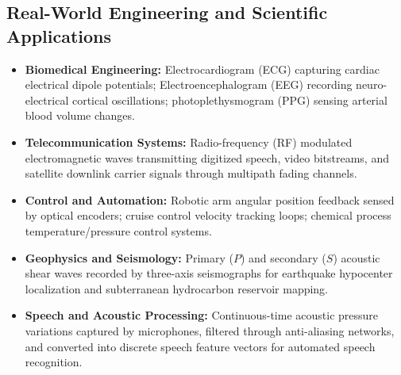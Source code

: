 \documentclass[12pt,a4paper]{article}
\begin{document}
\subsection{Real-World Engineering and Scientific Applications}
\begin{itemize}[leftmargin=*, itemsep=3pt]
  \item \textbf{Biomedical Engineering:} Electrocardiogram (ECG) capturing cardiac electrical dipole potentials; Electroencephalogram (EEG) recording neuro-electrical cortical oscillations; photoplethysmogram (PPG) sensing arterial blood volume changes.
  \item \textbf{Telecommunication Systems:} Radio-frequency (RF) modulated electromagnetic waves transmitting digitized speech, video bitstreams, and satellite downlink carrier signals through multipath fading channels.
  \item \textbf{Control and Automation:} Robotic arm angular position feedback sensed by optical encoders; cruise control velocity tracking loops; chemical process temperature/pressure control systems.
  \item \textbf{Geophysics and Seismology:} Primary ($P$) and secondary ($S$) acoustic shear waves recorded by three-axis seismographs for earthquake hypocenter localization and subterranean hydrocarbon reservoir mapping.
  \item \textbf{Speech and Acoustic Processing:} Continuous-time acoustic pressure variations captured by microphones, filtered through anti-aliasing networks, and converted into discrete speech feature vectors for automated speech recognition.
\end{itemize}

\begin{tcolorbox}[tikzbox, title={\textbf{General Input-Output System Architecture}}]
\begin{center}
\end{center}
\end{tcolorbox}
\end{document}
